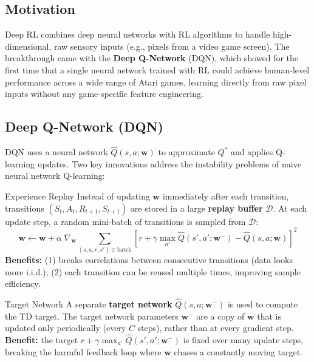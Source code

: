 \documentclass[11pt,a4paper]{article}
\newcommand{\term}[1]{\textcolor{DefGreen}{\textbf{#1}}}
\begin{document}
\subsection{Motivation}

Deep RL combines deep neural networks with RL algorithms to handle high-dimensional, raw sensory inputs (e.g., pixels from a video game screen). The breakthrough came with the \term{Deep Q-Network} (DQN), which showed for the first time that a single neural network trained with RL could achieve human-level performance across a wide range of Atari games, learning directly from raw pixel inputs without any game-specific feature engineering.

\subsection{Deep Q-Network (DQN)}

DQN uses a neural network $\hat{Q}(s,a;\mathbf{w})$ to approximate $Q^*$ and applies Q-learning updates. Two key innovations address the instability problems of naive neural network Q-learning:

\begin{defbox}{Experience Replay}
Instead of updating $\mathbf{w}$ immediately after each transition, transitions $(S_t,A_t,R_{t+1},S_{t+1})$ are stored in a large \term{replay buffer} $\mathcal{D}$. At each update step, a random mini-batch of transitions is sampled from $\mathcal{D}$:
\[
\mathbf{w} \leftarrow \mathbf{w} + \alpha\;\nabla_\mathbf{w}\!\sum_{(s,a,r,s')\in\text{batch}} \left[r + \gamma\max_{a'}\hat{Q}(s',a';\mathbf{w}^-) - \hat{Q}(s,a;\mathbf{w})\right]^2
\]
\textbf{Benefits:} (1) breaks correlations between consecutive transitions (data looks more i.i.d.); (2) each transition can be reused multiple times, improving sample efficiency.
\end{defbox}

\begin{defbox}{Target Network}
A separate \term{target network} $\hat{Q}(s,a;\mathbf{w}^-)$ is used to compute the TD target. The target network parameters $\mathbf{w}^-$ are a copy of $\mathbf{w}$ that is updated only periodically (every $C$ steps), rather than at every gradient step.\\[4pt]
\textbf{Benefit:} the target $r + \gamma\max_{a'}\hat{Q}(s',a';\mathbf{w}^-)$ is fixed over many update steps, breaking the harmful feedback loop where $\mathbf{w}$ chases a constantly moving target.
\end{defbox}
\end{document}
